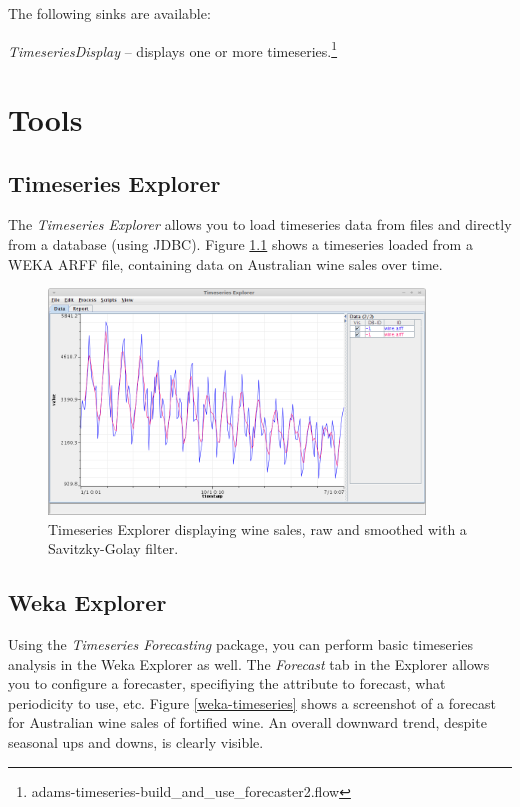 \documentclass[a4paper]{book}
\begin{document}
\noindent The following sinks are available:
\begin{tight_itemize}
	\item \textit{TimeseriesDisplay} -- displays one or more 
	timeseries.\footnote{adams-timeseries-build\_and\_use\_forecaster2.flow}
\end{tight_itemize}

\chapter{Tools}
\section{Timeseries Explorer}
The \textit{Timeseries Explorer} allows you to load timeseries data from files
and directly from a database (using JDBC). Figure \ref{timeseries_explorer}
shows a timeseries loaded from a WEKA ARFF file, containing data on Australian
wine sales over time.

\begin{figure}[htb]
  \centering
  \includegraphics[width=10.0cm]{images/timeseries_explorer.png}
  \caption{Timeseries Explorer displaying wine sales, raw and smoothed with a Savitzky-Golay filter.}
  \label{timeseries_explorer}
\end{figure}

\section{Weka Explorer}
Using the \textit{Timeseries Forecasting} package\cite{wekatimeseries}, you 
can perform basic timeseries analysis in the Weka Explorer as well. The
\textit{Forecast} tab in the Explorer allows you to configure a forecaster, 
specifiying the attribute to forecast, what periodicity to use, etc. Figure
\ref{weka-timeseries} shows a screenshot of a forecast for Australian wine
sales of fortified wine. An overall downward trend, despite seasonal ups and 
downs, is clearly visible.
\end{document}
